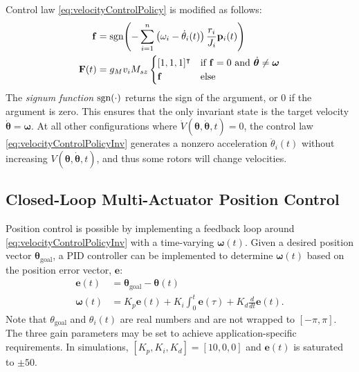 Control law \eqref{eq:velocityControlPolicy} is modified as follows:
   \begin{align}
\mathbf{f} & = \operatorname{sgn}\!\left(  -\sum_{i=1}^n \left(  \omega_i - \dot{\theta}_i(t) \right) \frac{r_i}{J_i}  \mathbf{p}_i(t)    \right)\nonumber\\
\mathbf{F}(t) &=g_{M}v_i M_{sz}\begin{cases} [1,1,1]^\intercal &\mbox{if } \mathbf{f} = 0 \mbox{ and } \dot{\bm{\theta}} \ne \bm{\omega} \\ 
					       \mathbf{f} & \mbox{else } \end{cases}
					       \label{eq:velocityControlPolicyInv}
   \end{align}
The \emph{signum function} $\operatorname{sgn}(\cdot)$ returns the sign of the argument, or 0 if the argument is zero. 
This ensures that the only invariant state is the target velocity $ \dot{\bm{\theta}} = \bm{\omega}$.  At all other configurations where $\dot{V}(\bm{\theta},\dot{\bm{\theta}},t) = 0$, the control law  \eqref{eq:velocityControlPolicyInv}  generates a nonzero acceleration $\ddot{\theta}_i(t)$ without increasing $V(\bm{\theta},\dot{\bm{\theta}},t)$, and thus some rotors will change velocities.   


\subsection{Closed-Loop Multi-Actuator Position Control}\label{subsec:PositionControl}

 
Position control is possible by implementing a feedback loop around \eqref{eq:velocityControlPolicyInv} with a time-varying $\bm{\omega}(t)$.  Given a desired position vector $\bm{\theta}_{\textrm{goal}}$, a PID controller can be implemented to determine $\bm{\omega}(t)$ based on the position error vector, $\mathbf{e}$:
   \begin{align}
\bm{e}(t) &=\bm{\theta}_{\textrm{goal}} - \bm{\theta}(t)\nonumber \\
\bm{\omega}(t) &= K_{p}  \bm{e}(t) + K_i\int_0^t \bm{e}(\tau) + K_d \frac{d}{dt} \bm{e}(t).
\label{eq:positioncontrol}
   \end{align}
 Note that $\theta_{\textrm{goal}}$ and $\theta_i(t)$ are real numbers and are not wrapped to $[-\pi,\pi]$. The three gain parameters may be set to achieve application-specific requirements.  In simulations, $[K_{p},K_i,K_d]=[10,0,0]$ and $\bm{e}(t)$ is saturated to  $\pm 50$.
 

 

